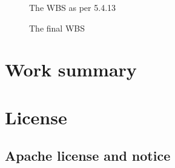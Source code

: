 \begin{figure}[p]
\setlength\fboxsep{0pt}
\setlength\fboxrule{1pt}\noindent{}
\caption{The WBS as per 5.4.13}
\label{fig:WBS54}
\end{figure}

\begin{figure}[p]
\setlength\fboxsep{0pt}
\setlength\fboxrule{1pt}\noindent{}
\caption{The final WBS}
\label{fig:WBSfin}
\end{figure}


\chapter{Work summary}
\label{tab:sprintList}


\chapter{License }
\section{Apache license and notice}
\label{appendix:license}

